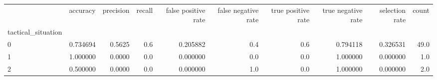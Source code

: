 \begin{tabular}{lrrrrrrrrr}
\toprule
{} &  accuracy &  precision &  recall &  false positive rate &  false negative rate &  true positive rate &  true negative rate &  selection rate &  count \\
tactical\_situation &           &            &         &                      &                      &                     &                     &                 &        \\
\midrule
0                  &  0.734694 &     0.5625 &     0.6 &             0.205882 &                  0.4 &                 0.6 &            0.794118 &        0.326531 &   49.0 \\
1                  &  1.000000 &     0.0000 &     0.0 &             0.000000 &                  0.0 &                 0.0 &            1.000000 &        0.000000 &    1.0 \\
2                  &  0.500000 &     0.0000 &     0.0 &             0.000000 &                  1.0 &                 0.0 &            1.000000 &        0.000000 &    2.0 \\
\bottomrule
\end{tabular}
